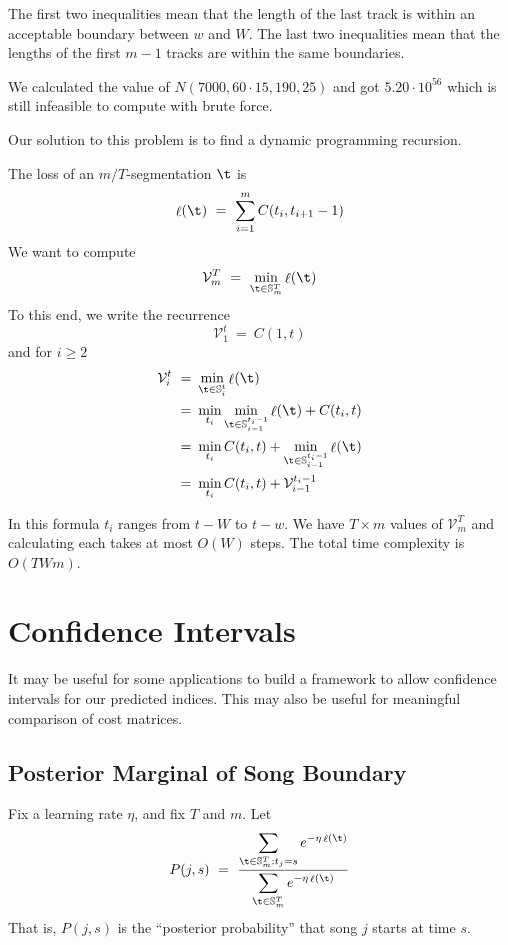 \documentclass[twocolumn]{article}
\DeclareMathOperator{\loss}{\ell}
\newcommand{\segs}{\mathbb S}
\newcommand{\best}{\mathcal V}
\begin{document}
	The first two inequalities mean that the length of the last track is within an acceptable boundary between $w$ and $W$. The last two inequalities mean that the lengths of the first $m-1$ tracks are within the same boundaries. 
	
	We calculated the value of $N(7000,60\cdot15,190,25)$ and got $5.20 \cdot 10^{56}$ which is still infeasible to compute with brute force.
	
	Our solution to this problem is to find a dynamic programming recursion.
	
	The loss of an $m/T$-segmentation $\t$ is 
	\[
	\loss(\t) 
	~=~
	\sum_{i=1}^m C(t_i, t_{i+1}-1)
	\]
	We want to compute
	\[
	\best^T_m ~=~ \min_{\t \in \segs^T_m} \loss(\t)
	\]
	To this end, we write the recurrence
	\begin{equation*}
		\best^t_1 ~=~ C(1, t) 
	\end{equation*}
	and for $i\ge2$
\begin{align*}
		\best^t_i ~=~& \min_{\t \in \segs^t_i} \loss(\t)  \\
		~=~& \min_{t_i} \min_{\t \in \segs^{t_i-1}_{i-1}} \loss(\t) + C(t_i, t)  \\
		~=~&  	\min_{t_i} C(t_i, t) + \min_{\t \in \segs^{t_i-1}_{i-1}} \loss(\t)  \\ 
		~=~& \min_{t_i} C(t_i, t) + \best^{t_i-1}_{i-1} \\
\end{align*}
	
	In this formula $t_i$ ranges from $t-W$ to $t-w$. We have $T \times m$ values of $\best^T_m$ and calculating each takes at most $O(W)$ steps. The total time complexity is $O(TWm)$.
	
\section{Confidence Intervals}\label{sec:confidence-intervals}
	
It may be useful for some applications to build a framework to allow confidence intervals for our predicted indices. This may also be useful for meaningful comparison of cost matrices.
	
	\subsection{Posterior Marginal of Song Boundary}
	Fix a learning rate $\eta$, and fix $T$ and $m$. Let
	\[
	P(j,s) ~=~ 
	\frac{\displaystyle
		\sum_{\t \in \segs^T_m : t_j = s} e^{- \eta \loss(\t)}
	}{\displaystyle
	\sum_{\t \in \segs^T_m} e^{- \eta \loss(\t)}
}
\]
That is, $P(j,s)$ is the ``posterior probability'' that song $j$ starts at time $s$.
\end{document}
